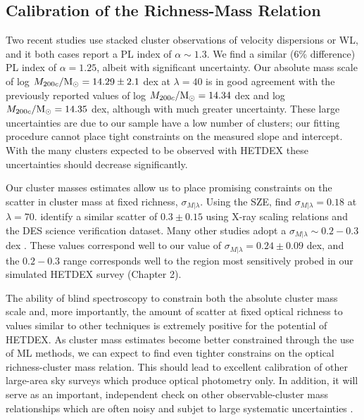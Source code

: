 \subsection{Calibration of the Richness-Mass Relation}
Two recent studies \citep{Farahi2016, Simet2016} use stacked cluster observations of velocity dispersions or WL, and it both cases report a PL index of $\alpha \sim 1.3$. We find a similar (6\% difference) PL index of $\alpha=1.25$, albeit with significant uncertainty. Our absolute mass scale of log $M_{200c}/\hbox{$\mathrm{M}_\odot$} = 14.29\pm2.1$ dex at $\lambda=40$ is in good agreement with the previously reported values of log $M_{200c}/\hbox{$\mathrm{M}_\odot$} = 14.34$ \citep{Simet2016} dex and log $M_{200c}/\hbox{$\mathrm{M}_\odot$} = 14.35$ \citep{Farahi2016} dex, although with much greater uncertainty. These large uncertainties are due to our sample have a low number of clusters; our fitting procedure cannot place tight constraints on the measured slope and intercept. With the many clusters expected to be observed with HETDEX these uncertainties should decrease significantly.

Our cluster masses estimates allow us to place promising constraints on the scatter in cluster mass at fixed richness, $\sigma_{M|\lambda}$. Using the SZE, \cite{Saro2015} find $\sigma_{M|\lambda} = 0.18$ at $\lambda = 70$. \cite{Rykoff2016} identify a similar scatter of $0.3\pm0.15$ using X-ray scaling relations and the DES science verification dataset. Many other studies  adopt a $\sigma_{M|\lambda}\sim 0.2-0.3$ dex \citep{Rozo2014, Rozo2015}. These values correspond well to our value of $\sigma_{M|\lambda} = 0.24\pm0.09$ dex, and the $0.2-0.3$ range corresponds well to the region most sensitively probed in our simulated HETDEX survey (Chapter 2).

The ability of blind spectroscopy to constrain both the absolute cluster mass scale and, more importantly, the amount of scatter at fixed optical richness to values similar to other techniques is extremely positive for the potential of HETDEX. As cluster mass estimates become better constrained through the use of ML methods, we can expect to find even tighter constrains on the optical richness-cluster mass relation. This should lead to excellent calibration of other large-area sky surveys which produce optical photometry only. In addition, it will serve as an important, independent check on other observable-cluster mass relationships which are often noisy and subjet to large systematic uncertainties .

